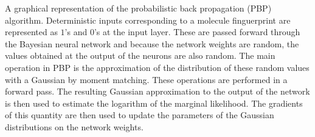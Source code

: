 A graphical representation of the probabilistic back propagation (PBP)
algorithm. Deterministic inputs 
corresponding to a molecule finguerprint are represented as $1$'s and $0$'s at the input
layer. These are passed forward through the Bayesian neural network and because
the network weights are random, the values obtained at the output of the
neurons are also random. The main operation in PBP is the approximation of the
distribution of these random values with a Gaussian by moment matching. These
operations are performed in a forward pass. The resulting Gaussian
approximation to the output of the network is then used to estimate the
logarithm of the marginal likelihood. The gradients of this quantity are then
used to update the parameters of the Gaussian distributions on the network
weights.

